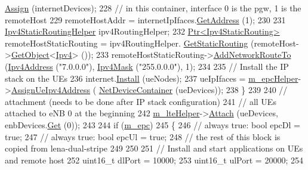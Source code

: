 \begin{DoxyCode}
      \hyperlink{classns3_1_1Ipv4AddressHelper_af8e7f4a1a7e74c00014a1eac445a27af}{Assign} (internetDevices);
228       \textcolor{comment}{// in this container, interface 0 is the pgw, 1 is the remoteHost}
229       remoteHostAddr = internetIpIfaces.\hyperlink{classns3_1_1Ipv4InterfaceContainer_ae63208dcd222be986822937ee4aa828c}{GetAddress} (1);
230 
231       \hyperlink{classns3_1_1Ipv4StaticRoutingHelper}{Ipv4StaticRoutingHelper} ipv4RoutingHelper;
232       \hyperlink{classns3_1_1Ptr}{Ptr<Ipv4StaticRouting>} remoteHostStaticRouting = ipv4RoutingHelper.
      \hyperlink{classns3_1_1Ipv4StaticRoutingHelper_a731206e50d305695dac7fb2ef963a4bb}{GetStaticRouting} (remoteHost->\hyperlink{classns3_1_1Object_a13e18c00017096c8381eb651d5bd0783}{GetObject}<\hyperlink{classns3_1_1Ipv4}{Ipv4}> ());
233       remoteHostStaticRouting->\hyperlink{classns3_1_1Ipv4StaticRouting_a8bf5eaa7ba49fe33c78c70d5560b6c39}{AddNetworkRouteTo} (\hyperlink{classns3_1_1Ipv4Address}{Ipv4Address} (\textcolor{stringliteral}{"7.0.0.0"}), 
      \hyperlink{classns3_1_1Ipv4Mask}{Ipv4Mask} (\textcolor{stringliteral}{"255.0.0.0"}), 1);
234 
235       \textcolor{comment}{// Install the IP stack on the UEs      }
236       internet.\hyperlink{classns3_1_1InternetStackHelper_a6645b412f31283d2d9bc3d8a95cebbc0}{Install} (ueNodes);
237       ueIpIfaces = \hyperlink{classLteX2HandoverTestCase_a17d20243fe4f7a49fe7fa1eeeff9f1f5}{m\_epcHelper}->\hyperlink{classns3_1_1PointToPointEpcHelper_a11102d32127163fdcc47c44623d4f0cc}{AssignUeIpv4Address} (
      \hyperlink{classns3_1_1NetDeviceContainer}{NetDeviceContainer} (ueDevices));
238     \}
239 
240   \textcolor{comment}{// attachment (needs to be done after IP stack configuration)}
241   \textcolor{comment}{// all UEs attached to eNB 0 at the beginning}
242   \hyperlink{classLteX2HandoverTestCase_afa4987b8bd9d1c3062f7705ef808be18}{m\_lteHelper}->\hyperlink{classns3_1_1LteHelper_a9466743f826aa2652a87907b7f0a1c87}{Attach} (ueDevices, enbDevices.\hyperlink{classns3_1_1NetDeviceContainer_a677d62594b5c9d2dea155cc5045f4d0b}{Get} (0));
243    
244   \textcolor{keywordflow}{if} (\hyperlink{classLteX2HandoverTestCase_ab6f7642cff4af84c7ba6a21388ee845e}{m\_epc})
245     \{
246       \textcolor{comment}{// always true: bool epcDl = true;}
247       \textcolor{comment}{// always true: bool epcUl = true;}
248       \textcolor{comment}{// the rest of this block is copied from lena-dual-stripe}
249 
250     
251       \textcolor{comment}{// Install and start applications on UEs and remote host}
252       uint16\_t dlPort = 10000;
253       uint16\_t ulPort = 20000;
254 

\end{DoxyCode}
